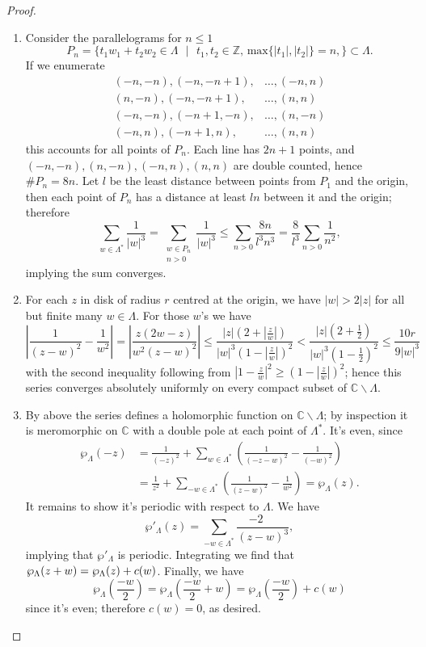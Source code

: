 \documentclass{article}
\theoremstyle{remark}
\begin{document}
\begin{proof}
\begin{enumerate}
\item Consider the parallelograms for $n\leq 1$
\[P_n=\{t_1w_1+t_2w_2\in\Lambda\text{ }|\text{ } t_1,t_2\in\mathbb{Z} \text{, max}\{|t_1|,|t_2|\}=n,  \}\subset \Lambda. \]
If we enumerate
\begin{align*}
(-n,-n),(-n,-n+1),&\ldots,(-n,n)\\
(n,-n),(-n,-n+1),&\ldots,(n,n) \\
(-n,-n),(-n+1,-n),&\ldots,(n,-n) \\
(-n,n),(-n+1,n),&\ldots,(n,n)
\end{align*}
this accounts for all points of $P_n$. Each line has $2n+1$ points, and $(-n,-n),(n,-n),(-n,n),(n,n)$ are double counted, hence $\# P_n=8n$. Let $l$ be the least distance between points from $P_1$ and the origin, then each point of $P_n$ has a distance at least $ln$ between it and the origin; therefore
\[ \sum_{w\in \Lambda^*}\frac{1}{|w|^3} =\sum_{\substack{w\in P_n\\ n>0}}\frac{1}{|w|^3}\leq \sum_{n>0}\frac{8n}{l^3 n^3}=\frac{8}{l^3}\sum_{n>0}\frac{1}{n^2},\]
implying the sum converges.
\item For each $z$ in disk of radius $r$ centred at the origin, we have $|w|>2|z|$ for all but finite many $w\in\Lambda$. For those $w$'s we have 
\[ \left| \frac{1}{(z-w)^2} - \frac{1}{w^2} \right| = \left| \frac{z(2w-z)}{w^2(z-w)^2} \right| \leq \frac{|z|(2+|\frac{z}{w}|)}{|w|^3 (1-|\frac{z}{w}|)^2 }< \frac{|z|(2+\frac{1}{2})}{|w|^3(1-\frac{1}{2})^2} \leq \frac{10r}{9|w|^3} \]
with the second inequality following from $|1-\frac{z}{w}|^2\geq (1-|\frac{z}{w}|)^2$; hence this series converges absolutely uniformly on every compact subset of $\mathbb{C}\backslash \Lambda$.
\item By above the series defines a holomorphic function on $\mathbb{C}\backslash \Lambda$; by inspection it is meromorphic on $\mathbb{C}$ with a double pole at each point of $\Lambda^*$. It's even, since
\begin{align*}
\wp_\Lambda (-z)&= \frac{1}{(-z)^2}+\sum_{w \in \Lambda^*} \left( \frac{1}{(-z-w)^2}-\frac{1}{(-w)^2} \right)\\
&=\frac{1}{z^2}+\sum_{-w \in \Lambda^*} \left( \frac{1}{(z-w)^2}-\frac{1}{w^2} \right)= \wp_\Lambda (z).
\end{align*} It remains to show it's periodic with respect to $\Lambda$. We have
\[ \wp '_\Lambda (z)= \sum_{-w \in \Lambda^*} \frac{-2\phantom{-}}{(z-w)^3}, \]
implying that $\wp '_\Lambda$ is periodic. Integrating we find that $\wp _\Lambda (z+w)\\ 
=\wp _\Lambda (z)+c(w)$. Finally, we have
\[ \wp _\Lambda \left(\frac{-w}{2}\right)=\wp _\Lambda \left(\frac{-w}{2}+w\right)=\wp _\Lambda \left(\frac{-w}{2} \right) +c(w) \]
since it's even; therefore $c(w)=0$, as desired.

\end{enumerate}
\end{proof}
\end{document}
